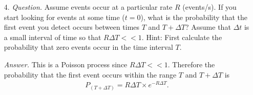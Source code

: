 \begin{itemize}
        \item[4.] \textit{Question.} Assume events occur at a particular rate $R$ (events/s). If you start looking for events at some time ($t=0$), what is the probability that the first event you detect occurs between times $T$ and $T+\Delta T$? Assume that $\Delta t$ is a small interval of time so that $R\Delta T<<1$. Hint: First calculate the probability that zero events occur in the time interval $T$.
        
        \textit{Answer.} This is a Poisson process since $R\Delta T << 1$. Therefore the probability that the first event occurs within the range $T$ and $T + \Delta T$ is
        \begin{align}
            P_{(T + \Delta T)} = R\Delta T \times e^{-R\Delta T}.
        \end{align}
        
\end{itemize}


